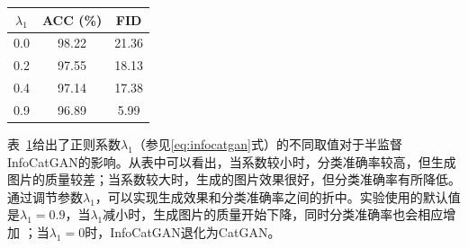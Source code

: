 \begin{table}[htbp]
  \renewcommand\arraystretch{0.7} %
  \centering
  \label{tab:lambda1}
  \begin{tabular}{ccc}
    \toprule
    \textbf{$\lambda_1$} & \textbf{ACC (\%)} & \textbf{FID} \\
    \midrule
    0.0 & 98.22 & 21.36 \\
    0.2 & 97.55 & 18.13 \\
    0.4 & 97.14 & 17.38 \\
    0.9 & 96.89 & 5.99 \\
    \bottomrule
  \end{tabular}
\end{table}
表~\ref{tab:lambda1}给出了正则系数$\lambda_1$（参见\eqref{eq:infocatgan}式）的不同取值对于半监督InfoCatGAN的影响。从表中可以看出，当系数较小时，分类准确率较高，但生成图片的质量较差；当系数较大时，生成的图片效果很好，但分类准确率有所降低。通过调节参数$\lambda_1$，可以实现生成效果和分类准确率之间的折中。实验使用的默认值是$\lambda_1 = 0.9$，当$\lambda_1$减小时，生成图片的质量开始下降，同时分类准确率也会相应增加 ；当$\lambda_1 = 0$时，InfoCatGAN退化为CatGAN。



